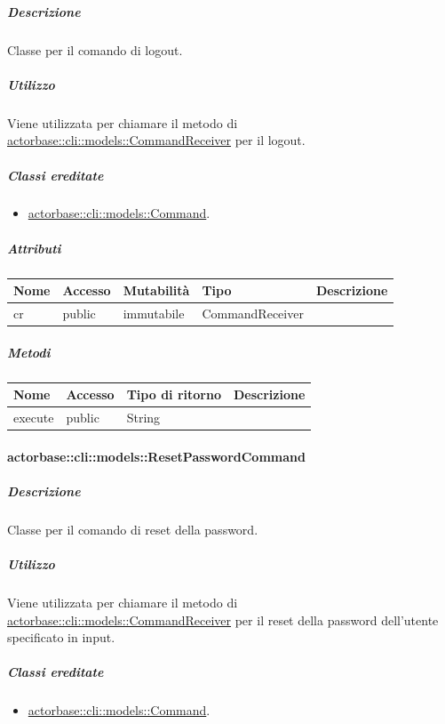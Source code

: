 \documentclass{scalatekids-article}
\begin{document}
\subparagraph{Descrizione}

Classe per il comando di logout.

\subparagraph{Utilizzo}

Viene utilizzata per chiamare il metodo di
\hyperref[sec:actorbase::cli::models::CommandReceiver]{actorbase::cli::models::CommandReceiver} per il logout.

\subparagraph{Classi ereditate}

\begin{itemize}
\item \hyperref[sec:actorbase::cli::models::Command]{actorbase::cli::models::Command}.
\end{itemize}

\subparagraph{Attributi}

\begin{tabular}{| l | l | l | l | l |}
	\hline
	Nome & Accesso & Mutabilità & Tipo & Descrizione\\
	\hline
	cr & public & immutabile & CommandReceiver & \\
	\hline
\end{tabular}

\subparagraph{Metodi}

\begin{tabular}{| l | l | l | l |}
	\hline
	Nome & Accesso & Tipo di ritorno & Descrizione\\
	\hline
	execute & public & String & \\
	\hline
\end{tabular}

\paragraph{actorbase::cli::models::ResetPasswordCommand}
\label{sec:actorbase::cli::models::ResetPasswordCommand}

\subparagraph{Descrizione}

Classe per il comando di reset della password.

\subparagraph{Utilizzo}

Viene utilizzata per chiamare il metodo di
\hyperref[sec:actorbase::cli::models::CommandReceiver]{actorbase::cli::models::CommandReceiver} per il reset della password
dell'utente specificato in input.

\subparagraph{Classi ereditate}

\begin{itemize}
\item \hyperref[sec:actorbase::cli::models::Command]{actorbase::cli::models::Command}.
\end{itemize}
\end{document}
